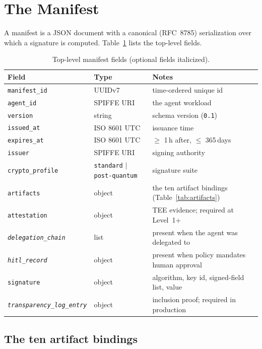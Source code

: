 \section{The Manifest}
\label{sec:model}

A manifest is a JSON document with a canonical (RFC~8785) serialization over which a
signature is computed. Table~\ref{tab:top} lists the top-level fields.

\begin{table}[h]
\centering
\small
\caption{Top-level manifest fields (optional fields italicized).}
\label{tab:top}
\begin{tabular}{p{3.7cm}p{3.6cm}p{4.9cm}}
\toprule
Field & Type & Notes \\
\midrule
\texttt{manifest\_id} & UUIDv7~\citep{uuid9562} & time-ordered unique id \\
\texttt{agent\_id} & SPIFFE URI & the agent workload \\
\texttt{version} & string & schema version (\texttt{0.1}) \\
\texttt{issued\_at} & ISO 8601 UTC & issuance time \\
\texttt{expires\_at} & ISO 8601 UTC & $\geq$ 1\,h after, $\leq$ 365\,days \\
\texttt{issuer} & SPIFFE URI & signing authority \\
\texttt{crypto\_profile} & \texttt{standard} $|$ \texttt{post-quantum} & signature suite \\
\texttt{artifacts} & object & the ten artifact bindings (Table~\ref{tab:artifacts}) \\
\texttt{attestation} & object & TEE evidence; required at Level~1+ \\
\emph{\texttt{delegation\_chain}} & list & present when the agent was delegated to \\
\emph{\texttt{hitl\_record}} & object & present when policy mandates human approval \\
\texttt{signature} & object & algorithm, key id, signed-field list, value \\
\emph{\texttt{transparency\_log\_entry}} & object & inclusion proof; required in production \\
\bottomrule
\end{tabular}
\end{table}

\subsection{The ten artifact bindings}

